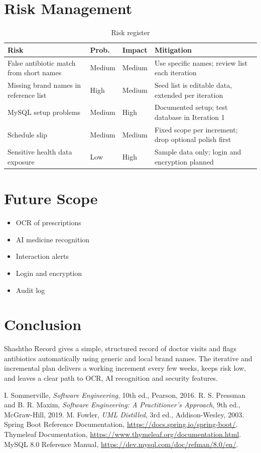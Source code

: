 \documentclass[11pt,a4paper]{article}
\begin{document}
\section{Risk Management}
\begin{table}[H]
\centering
\caption{Risk register}
\begin{tabularx}{\textwidth}{YllY}
\toprule
\textbf{Risk} & \textbf{Prob.} & \textbf{Impact} & \textbf{Mitigation}\\
\midrule
False antibiotic match from short names & Medium & Medium & Use specific names; review list each iteration\\
Missing brand names in reference list & High & Medium & Seed list is editable data, extended per iteration\\
MySQL setup problems & Medium & High & Documented setup; test database in Iteration 1\\
Schedule slip & Medium & Medium & Fixed scope per increment; drop optional polish first\\
Sensitive health data exposure & Low & High & Sample data only; login and encryption planned\\
\bottomrule
\end{tabularx}
\end{table}

\section{Future Scope}
\begin{itemize}
  \item OCR of prescriptions
  \item AI medicine recognition
  \item Interaction alerts
  \item Login and encryption
  \item Audit log
\end{itemize}

\section{Conclusion}
Shashtho Record gives a simple, structured record of doctor visits and flags antibiotics automatically using generic and local brand names. The iterative and incremental plan delivers a working increment every few weeks, keeps risk low, and leaves a clear path to OCR, AI recognition and security features.

\begin{thebibliography}{9}
 I. Sommerville, \emph{Software Engineering}, 10th ed., Pearson, 2016.
 R. S. Pressman and B. R. Maxim, \emph{Software Engineering: A Practitioner's Approach}, 9th ed., McGraw-Hill, 2019.
 M. Fowler, \emph{UML Distilled}, 3rd ed., Addison-Wesley, 2003.
 Spring Boot Reference Documentation, \url{https://docs.spring.io/spring-boot/}.
 Thymeleaf Documentation, \url{https://www.thymeleaf.org/documentation.html}.
 MySQL 8.0 Reference Manual, \url{https://dev.mysql.com/doc/refman/8.0/en/}.
\end{thebibliography}
\end{document}
